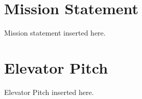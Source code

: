 
\section{Mission Statement}
Mission statement inserted here.   

\section{Elevator Pitch}
Elevator Pitch inserted here.   
